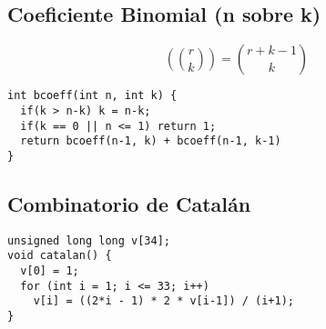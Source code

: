 \documentclass[10pt, a4, oneside]{article}
\begin{document}
\subsection{Coeficiente Binomial (n sobre k)}
\[ \left( {r \choose k} \right) = {r+k-1 \choose k} \]
\begin{verbatim}
int bcoeff(int n, int k) {
  if(k > n-k) k = n-k;
  if(k == 0 || n <= 1) return 1;
  return bcoeff(n-1, k) + bcoeff(n-1, k-1)
}
\end{verbatim}

\subsection{Combinatorio de Catalán}
\begin{verbatim}
unsigned long long v[34];
void catalan() {
  v[0] = 1;
  for (int i = 1; i <= 33; i++)
    v[i] = ((2*i - 1) * 2 * v[i-1]) / (i+1);
}
\end{verbatim}
\end{document}
